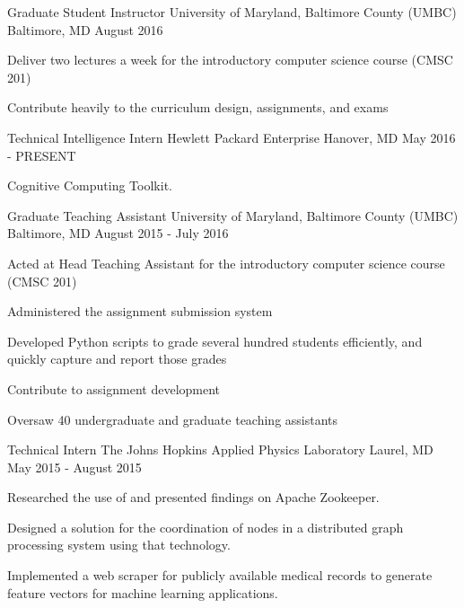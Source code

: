 \begin{cventries}

\cventry
{Graduate Student Instructor}
{University of Maryland, Baltimore County (UMBC)}
{Baltimore, MD}
{August 2016}
{
    \begin{cvitems}
        \item{Deliver two lectures a week for the introductory computer science course (CMSC 201)}
        \item{Contribute heavily to the curriculum design, assignments, and exams}
    \end{cvitems}
}

\cventry
{Technical Intelligence Intern}
{Hewlett Packard Enterprise}
{Hanover, MD}
{May 2016 - PRESENT}
{
    \begin{cvitems}
        \item{Cognitive Computing Toolkit.}
    \end{cvitems}
}

\cventry
{Graduate Teaching Assistant}
{University of Maryland, Baltimore County (UMBC)}
{Baltimore, MD}
{August 2015 - July 2016}
{
    \begin{cvitems}
        \item {Acted at Head Teaching Assistant for the introductory computer science course (CMSC 201)}
        \item {Administered the assignment submission system}
        \item {Developed Python scripts to grade several hundred students efficiently, and quickly capture and report those grades}
        \item {Contribute to assignment development}
        \item {Oversaw 40 undergraduate and graduate teaching assistants}
    \end{cvitems}
}
    

\cventry
{Technical Intern}
{The Johns Hopkins Applied Physics Laboratory}
{Laurel, MD}
{May 2015 - August 2015}
{
    \begin{cvitems}
        \item{Researched the use of and presented findings on Apache Zookeeper.}
        \item{Designed a solution for the coordination of nodes in a distributed graph processing system using that technology.}
        \item{Implemented a web scraper for publicly available medical records to generate feature vectors for machine learning applications.}
    \end{cvitems}
}


\end{cventries}
